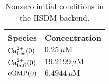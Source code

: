 \documentclass[a4paper, 12pt]{book}
\begin{document}
\begin{table}[H]
\centering
\caption{Nonzero initial conditions in the HSDM backend.}
\label{tab_init_mouse}
\begin{tabular}{l | l}
Species & Concentration \\
\hline
\hline
${\rm Ca}^{2+}_{\rm free}(0)$ & $0.25\,\mu\mathrm{M}$\\
\hline
${\rm Ca}^{2+}_{\rm buff}(0)$ & $19.2199\,\mu\mathrm{M}$\\
\hline
${\rm cGMP}(0)$ & $6.4944\,\mu\mathrm{M}$\\
\hline
\end{tabular}
\end{table}
\end{document}
